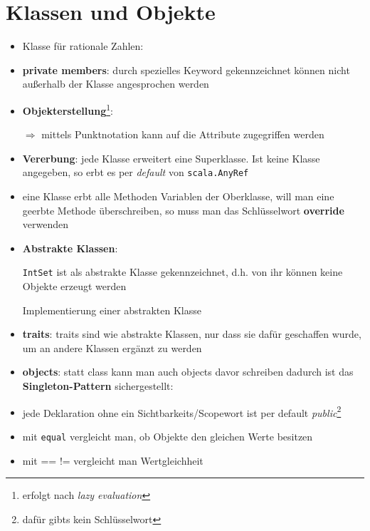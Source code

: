 \section{Klassen und Objekte}
\begin{itemize}
  \item Klasse für rationale Zahlen:
  
  
  
  \item \textbf{private members}: durch spezielles Keyword gekennzeichnet
  \und können nicht außerhalb der Klasse angesprochen werden
  \item \textbf{Objekterstellung}\footnote{erfolgt nach 
  \textit{lazy evaluation}}:
  
  
  
  
  $\Rightarrow$ mittels Punktnotation kann auf die Attribute zugegriffen
  werden
  \item \textbf{Vererbung}: jede Klasse erweitert eine Superklasse. Ist
  keine Klasse angegeben, so erbt es per \textit{default} von
  \texttt{scala.AnyRef}
  
  
  
  \item eine Klasse erbt alle Methoden \und Variablen der Oberklasse, will
  man eine geerbte Methode überschreiben, so muss man das Schlüsselwort
  \textbf{override} verwenden
  
  
    
  \item \textbf{Abstrakte Klassen}: 
  
  
  
  \texttt{IntSet} ist als abstrakte Klasse gekennzeichnet, d.h. von ihr können
  keine Objekte erzeugt werden
  
  Implementierung einer abstrakten Klasse
  
  
  
  \item \textbf{traits}: traits sind wie abstrakte Klassen, nur dass sie
  dafür geschaffen wurde, um an andere Klassen ergänzt zu werden
  
  
  \item \textbf{objects}: statt class kann man auch objects davor schreiben
  \und dadurch ist das \textbf{Singleton-Pattern} sichergestellt:
  
  
  
  \item jede Deklaration ohne ein Sichtbarkeits/Scopewort ist per default
  \textit{public}\footnote{dafür gibts kein Schlüsselwort}
  \item mit \texttt{equal} vergleicht man, ob Objekte den gleichen
  Werte besitzen
  \item mit == \und != vergleicht man Wertgleichheit

\end{itemize}


